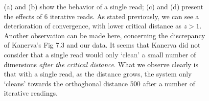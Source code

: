 \begin{figure}[h!]
  \centering


  \caption{(a) and (b) show the behavior of a single read; (c) and (d) present the effects of 6 iterative reads. As stated previously, we can see a deterioration of convergence, with lower critical distance as $z>1$.  Another observation can be made here, concerning the discrepancy of Kanerva's Fig 7.3 and our data.  It seems that Kanerva did not consider that a single read would only `clean' a small number of dimensions \emph{after the critical distance}. What we observe clearly is that with a single read, as the distance grows, the system only `cleans' towards the orthoghonal distance 500 after a number of iterative readings.}
  \label{fig:murillo-generalization-experiments}
\end{figure}

